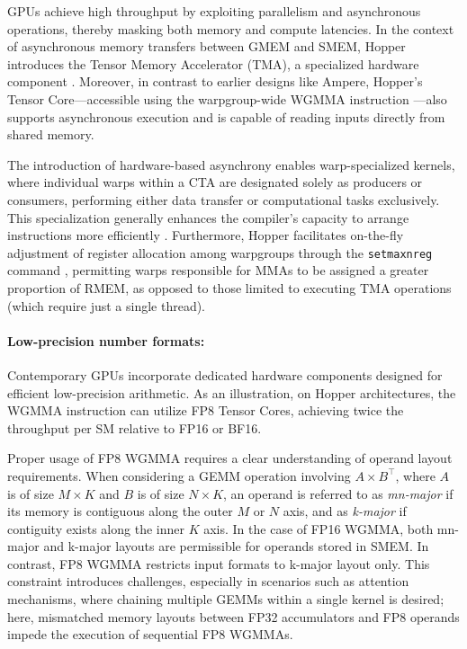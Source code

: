 GPUs achieve high throughput by exploiting parallelism and asynchronous operations, thereby masking both memory and compute latencies. In the context of asynchronous memory transfers between GMEM and SMEM, Hopper introduces the Tensor Memory Accelerator (TMA), a specialized hardware component \cite[\S7.29]{cuda}. Moreover, in contrast to earlier designs like Ampere, Hopper’s Tensor Core—accessible using the warpgroup-wide WGMMA instruction \cite[\S9.7.14]{ptx}—also supports asynchronous execution and is capable of reading inputs directly from shared memory.

The introduction of hardware-based asynchrony enables warp-specialized kernels, where individual warps within a CTA are designated solely as producers or consumers, performing either data transfer or computational tasks exclusively. This specialization generally enhances the compiler’s capacity to arrange instructions more efficiently \citep{warp-specialization-2011}. Furthermore, Hopper facilitates on-the-fly adjustment of register allocation among warpgroups through the \verb|setmaxnreg| command \cite[\S9.7.17.1]{ptx}, permitting warps responsible for MMAs to be assigned a greater proportion of RMEM, as opposed to those limited to executing TMA operations (which require just a single thread).

\paragraph{Low-precision number formats:}
\label{sec:low-precision-gpu}
Contemporary GPUs incorporate dedicated hardware components designed for efficient low-precision arithmetic. As an illustration, on Hopper architectures, the WGMMA instruction can utilize FP8 Tensor Cores, achieving twice the throughput per SM relative to FP16 or BF16.

Proper usage of FP8 WGMMA requires a clear understanding of operand layout requirements. When considering a GEMM operation involving $A \times B^{\top}$, where $A$ is of size $M \times K$ and $B$ is of size $N \times K$, an operand is referred to as \emph{mn-major} if its memory is contiguous along the outer $M$ or $N$ axis, and as \emph{k-major} if contiguity exists along the inner $K$ axis. In the case of FP16 WGMMA, both mn-major and k-major layouts are permissible for operands stored in SMEM. In contrast, FP8 WGMMA restricts input formats to k-major layout only. This constraint introduces challenges, especially in scenarios such as attention mechanisms, where chaining multiple GEMMs within a single kernel is desired; here, mismatched memory layouts between FP32 accumulators and FP8 operands impede the execution of sequential FP8 WGMMAs.

